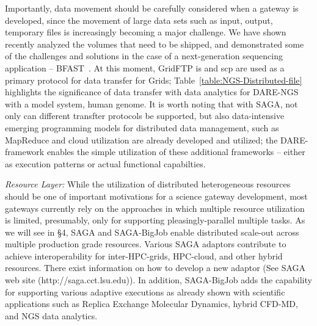 \documentclass{sig-alternate}
\begin{document}
Importantly, data movement should be carefully considered when a
gateway is developed, since the movement of large data sets such as
input, output, temporary files is increasingly becoming a major
challenge. We have shown recently analyzed the volumes that need to be
shipped, and demonstrated some of the challenges and solutions in the
case of a next-generation sequencing application --
BFAST~\cite{ecmls11}. At this moment, GridFTP is and scp are used as a
primary protocol for data transfer for Grids;
Table~\ref{table:NGS-Distributed-file} highlights the significance of
data transfer with data analytics for DARE-NGS with a model system,
human genome.  It is worth noting that with SAGA, not only can
different transfter protocols be supported, but also data-intensive
emerging programming models for distributed data management, such as
MapReduce and cloud utilization are already developed and
utilized\cite{abstractions-azure,saga-ccgrid10}; the DARE-framework
enables the simple utilization of these additional frameworks --
either as execution patterns or actual functional capabilties.

%

\textit{Resource Layer:} While the utilization of distributed
heterogeneous resources should be one of important motivations for a
science gateway development, most gateways currently rely on the
approaches in which multiple resource utilization is limited,
presumably, only for supporting pleasingly-parallel multiple tasks.
As we will see in \S4, SAGA and SAGA-BigJob enable distributed
scale-out across multiple production grade resources. Various SAGA
adaptors contribute to achieve interoperability for inter-HPC-grids,
HPC-cloud, and other hybrid resources.  There exist information on how
to develop a new adaptor (See SAGA web site
(http://saga.cct.lsu.edu)). In addition, SAGA-BigJob adds the
capability for supporting various adaptive executions as already shown
with scientific applications such as Replica Exchange Molecular
Dynamics, hybrid CFD-MD, and NGS data
analytics\cite{saga-royalsoc,coupled,ecmls11}.
\end{document}
